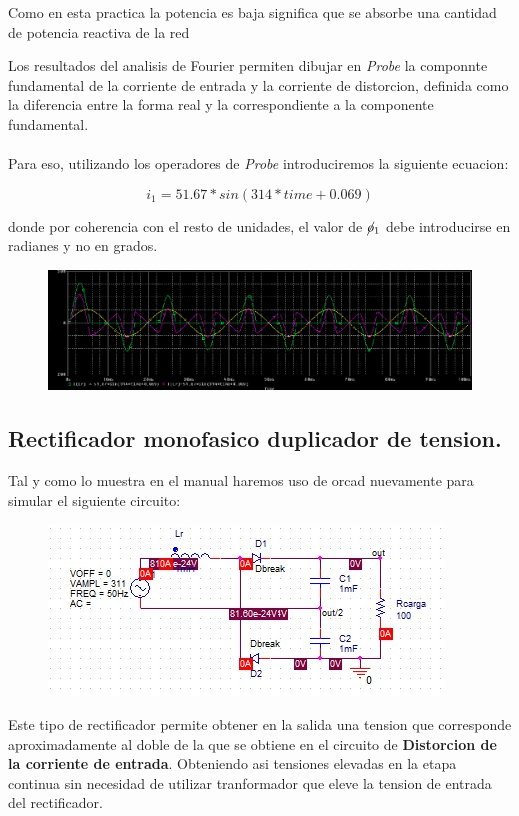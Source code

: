 \documentclass[11pt,a4paper]{article}
\begin{document}
Como en esta practica la potencia es baja significa que se absorbe una cantidad de potencia reactiva de la red 

Los resultados del analisis de Fourier permiten dibujar en \emph{Probe} la componnte fundamental de la corriente de entrada y la corriente de distorcion, definida como la diferencia entre la forma real y la correspondiente a la componente fundamental.\\
\\
Para eso, utilizando los operadores de \emph{Probe} introduciremos la siguiente ecuacion:

$$ i_{1} = 51.67 * sin(314*time + 0.069) $$

donde por coherencia con el resto de unidades, el valor de $ \cancel{o}_{1} $ debe introducirse en radianes y no en grados.

\begin{figure}[h]
\centering
\includegraphics[scale=.4]{9.png} 
\end{figure}

\subsection{Rectificador monofasico duplicador de tension.}
Tal y como lo muestra en el manual haremos uso de orcad nuevamente para simular el siguiente circuito:

\begin{figure}[h]
\centering
\includegraphics[scale=.5]{10.png} 
\end{figure}

Este tipo de rectificador permite obtener en la salida una tension que corresponde aproximadamente al doble de la que se obtiene en el circuito de \textbf{Distorcion de la corriente de entrada}. Obteniendo asi tensiones elevadas en la etapa continua sin necesidad de utilizar tranformador que eleve la tension de entrada del rectificador.
\end{document}
